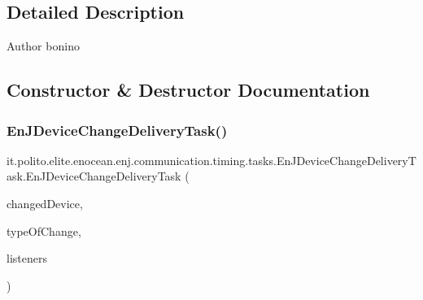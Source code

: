\subsection{Detailed Description}
\begin{DoxyAuthor}{Author}
bonino 
\end{DoxyAuthor}


\subsection{Constructor \& Destructor Documentation}
\hypertarget{classit_1_1polito_1_1elite_1_1enocean_1_1enj_1_1communication_1_1timing_1_1tasks_1_1_en_j_device_change_delivery_task_a72a97d7ae51017fd667bf27c7b80d823}{}\label{classit_1_1polito_1_1elite_1_1enocean_1_1enj_1_1communication_1_1timing_1_1tasks_1_1_en_j_device_change_delivery_task_a72a97d7ae51017fd667bf27c7b80d823} 
\subsubsection{\texorpdfstring{En\+J\+Device\+Change\+Delivery\+Task()}{EnJDeviceChangeDeliveryTask()}}
{\footnotesize\ttfamily it.\+polito.\+elite.\+enocean.\+enj.\+communication.\+timing.\+tasks.\+En\+J\+Device\+Change\+Delivery\+Task.\+En\+J\+Device\+Change\+Delivery\+Task (\begin{DoxyParamCaption}\item[{\hyperlink{classit_1_1polito_1_1elite_1_1enocean_1_1enj_1_1model_1_1_en_ocean_device}{En\+Ocean\+Device}}]{changed\+Device,  }\item[{\hyperlink{enumit_1_1polito_1_1elite_1_1enocean_1_1enj_1_1communication_1_1_en_j_device_change_type}{En\+J\+Device\+Change\+Type}}]{type\+Of\+Change,  }\item[{Set$<$ \hyperlink{interfaceit_1_1polito_1_1elite_1_1enocean_1_1enj_1_1communication_1_1_en_j_device_listener}{En\+J\+Device\+Listener} $>$}]{listeners }\end{DoxyParamCaption})}

